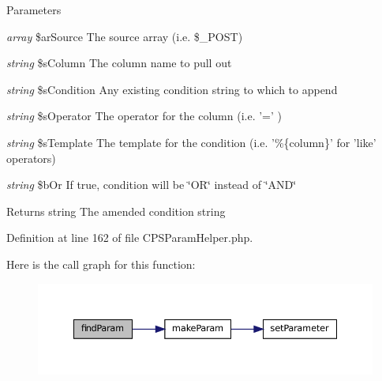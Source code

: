 \begin{DoxyParams}{Parameters}
\item[{\em array}]\$arSource The source array (i.e. \$\_\-POST) \item[{\em string}]\$sColumn The column name to pull out \item[{\em string}]\$sCondition Any existing condition string to which to append \item[{\em string}]\$sOperator The operator for the column (i.e. '=' ) \item[{\em string}]\$sTemplate The template for the condition (i.e. '\%\{column\}' for 'like' operators) \item[{\em string}]\$bOr If true, condition will be \char`\"{}OR\char`\"{} instead of \char`\"{}AND\char`\"{}\end{DoxyParams}
\begin{DoxyReturn}{Returns}
string The amended condition string 
\end{DoxyReturn}


Definition at line 162 of file CPSParamHelper.php.








Here is the call graph for this function:\nopagebreak
\begin{figure}[H]
\begin{center}
\leavevmode
\includegraphics[width=374pt]{classCPSParamHelper_a63c76688969153ba5b4d4fb858d6c679_cgraph}
\end{center}
\end{figure}




